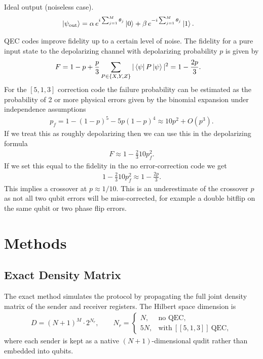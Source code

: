 Ideal output (noiseless case).
\begin{align}
\ket{\psi_{\mathrm{out}}}
&= \alpha\,e^{i\sum_{j=1}^{M}\theta_j}\ket{0} + \beta\,e^{-i\sum_{j=1}^{M}\theta_j}\ket{1}.
\end{align}

QEC codes improve fidelity up to a certain level of noise. The fidelity for a pure input state to the depolarizing channel with depolarizing probability $p$ is given by
\begin{align}
    F &= 1-p + \frac{p}{3}\sum_{P \in \{X,Y,Z\}} |\bra{\psi} P \ket{\psi} |^2 = 1 - \frac{2p}{3}.
\end{align}
For the $[5,1,3]$ correction code the failure probability can be estimated as the probability of 2 or more physical errors given by the binomial expansion under independence assumptions
\begin{align}
    p_{f} = 1 - (1-p)^5 - 5p(1-p)^4 \approx 10p^2 + O(p^3).
\end{align}
If we treat this as roughly depolarizing then we can use this in the depolarizing formula
\begin{align}
    F \approx 1 - \frac{2}{3} 10 p_{f}^2.
\end{align}
If we set this equal to the fidelity in the no error-correction code we get
\begin{align}
    1 - \frac{2}{3} 10 p_{f}^2 \approx 1 - \frac{2p}{3}.
\end{align}
This implies a crossover at $p \approx 1/10$. This is an underestimate of the crossover $p$ as not all two qubit errors will be miss-corrected, for example a double bitflip on the same qubit or two phase flip errors.

\section{Methods}
\subsection{Exact Density Matrix}
The exact method simulates the protocol by propagating the full joint density matrix of the sender and receiver registers. The Hilbert space dimension is
\begin{align}
    D = (N+1)^M \cdot 2^{N_r}, \qquad
    N_r = \begin{cases} N, & \text{no QEC}, \\ 5N, & \text{with}~[[5,1,3]]~\text{QEC}, \end{cases}
\end{align}
where each sender is kept as a native $(N{+}1)$-dimensional qudit rather than embedded into qubits.


